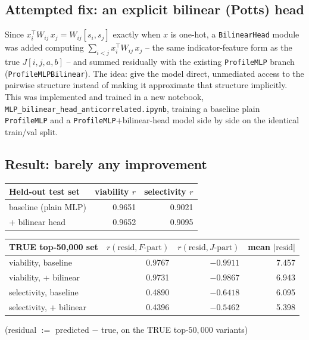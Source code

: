 \documentclass[11pt]{article}
\newcommand{\code}[1]{\texttt{#1}}
\begin{document}
\subsection{Attempted fix: an explicit bilinear (Potts) head}

Since $x_i^\top W_{ij}\, x_j = W_{ij}[s_i, s_j]$ exactly when $x$ is one-hot, a
\code{BilinearHead} module was added computing $\sum_{i<j} x_i^\top W_{ij}\, x_j$ -- the same
indicator-feature form as the true $J[i,j,a,b]$ -- and summed residually with the existing
\code{ProfileMLP} branch (\code{ProfileMLPBilinear}). The idea: give the model direct,
unmediated access to the pairwise structure instead of making it approximate that structure
implicitly. This was implemented and trained in a new notebook,
\code{MLP\_bilinear\_head\_anticorrelated.ipynb}, training a baseline plain \code{ProfileMLP} and a
\code{ProfileMLP}+bilinear-head model side by side on the identical train/val split.

\subsection{Result: barely any improvement}

\begin{center}
\begin{tabular}{lrr}
\hline
\textbf{Held-out test set} & viability $r$ & selectivity $r$ \\
\hline
baseline (plain MLP) & 0.9651 & 0.9021 \\
+ bilinear head & 0.9652 & 0.9095 \\
\hline
\end{tabular}

\vspace{1em}
\begin{tabular}{lrrr}
\hline
\textbf{TRUE top-50{,}000 set} & $r(\text{resid}, F\text{-part})$ & $r(\text{resid}, J\text{-part})$ & mean $|\text{resid}|$\\
\hline
viability, baseline     & 0.9767 & $-0.9911$ & 7.457 \\
viability, + bilinear   & 0.9731 & $-0.9867$ & 6.943 \\
selectivity, baseline   & 0.4890 & $-0.6418$ & 6.095 \\
selectivity, + bilinear & 0.4396 & $-0.5462$ & 5.398 \\
\hline
\end{tabular}
\end{center}
(residual $:=$ predicted $-$ true, on the TRUE top-$50{,}000$ variants)
\end{document}
